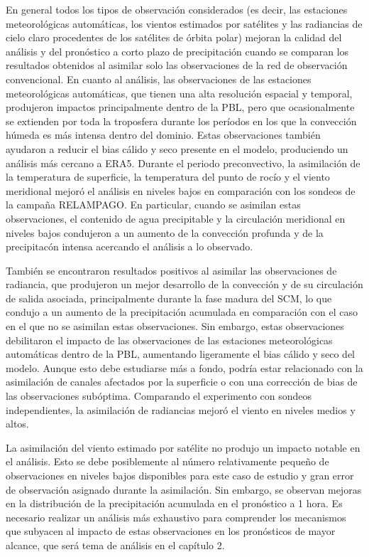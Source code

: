 \documentclass[12pt,oneside]{reedthesis}
\begin{document}
En general todos los tipos de observación considerados (es decir, las estaciones meteorológicas automáticas, los vientos estimados por satélites y las radiancias de cielo claro procedentes de los satélites de órbita polar) mejoran la calidad del análisis y del pronóstico a corto plazo de precipitación cuando se comparan los resultados obtenidos al asimilar solo las observaciones de la red de observación convencional. En cuanto al análisis, las observaciones de las estaciones meteorológicas automáticas, que tienen una alta resolución espacial y temporal, produjeron impactos principalmente dentro de la PBL, pero que ocasionalmente se extienden por toda la troposfera durante los períodos en los que la convección húmeda es más intensa dentro del dominio. Estas observaciones también ayudaron a reducir el bias cálido y seco presente en el modelo, produciendo un análisis más cercano a ERA5. Durante el periodo preconvectivo, la asimilación de la temperatura de superficie, la temperatura del punto de rocío y el viento meridional mejoró el análisis en niveles bajos en comparación con los sondeos de la campaña RELAMPAGO. En particular, cuando se asimilan estas observaciones, el contenido de agua precipitable y la circulación meridional en niveles bajos condujeron a un aumento de la convección profunda y de la precipitacón intensa acercando el análisis a lo observado.

También se encontraron resultados positivos al asimilar las observaciones de radiancia, que produjeron un mejor desarrollo de la convección y de su circulación de salida asociada, principalmente durante la fase madura del SCM, lo que condujo a un aumento de la precipitación acumulada en comparación con el caso en el que no se asimilan estas observaciones. Sin embargo, estas observaciones debilitaron el impacto de las observaciones de las estaciones meteorológicas automáticas dentro de la PBL, aumentando ligeramente el bias cálido y seco del modelo. Aunque esto debe estudiarse más a fondo, podría estar relacionado con la asimilación de canales afectados por la superficie o con una corrección de bias de las observaciones subóptima. Comparando el experimento con sondeos independientes, la asimilación de radiancias mejoró el viento en niveles medios y altos.

La asimilación del viento estimado por satélite no produjo un impacto notable en el análisis. Esto se debe posiblemente al número relativamente pequeño de observaciones en niveles bajos disponibles para este caso de estudio y gran error de observación asignado durante la asimilación. Sin embargo, se observan mejoras en la distribución de la precipitación acumulada en el pronóstico a 1 hora. Es necesario realizar un análisis más exhaustivo para comprender los mecanismos que subyacen al impacto de estas observaciones en los pronósticos de mayor alcance, que será tema de análisis en el capítulo 2.
\end{document}

